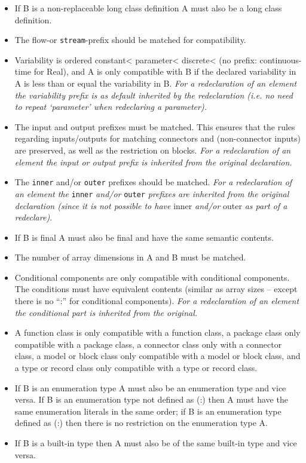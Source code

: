 \begin{itemize}
  \begin{itemize}
  \item
    If B is a non-replaceable long class definition A must also be a
    long class definition.
  \item
    The flow-or \lstinline[basicstyle=\ttfamily]!stream!-prefix should be matched for compatibility.
  \item
    Variability is ordered constant\textless{} parameter\textless{}
    discrete\textless{} (no prefix: continuous-time for Real), and A is
    only compatible with B if the declared variability in A is less than
    or equal the variability in B. \emph{For a redeclaration of an
    element the variability prefix is as default inherited by the
    redeclaration (i.e. no need to repeat `parameter' when redeclaring a
    parameter).}
  \item
    The input and output prefixes must be matched. This ensures that the
    rules regarding inputs/outputs for matching connectors and
    (non-connector inputs) are preserved, as well as the restriction on
    blocks. \emph{For a redeclaration of an element the input or output
    prefix is inherited from the original declaration.}
  \item
    The \lstinline[basicstyle=\ttfamily]!inner! and/or \lstinline[basicstyle=\ttfamily]!outer! prefixes should be matched. \emph{For a
    redeclaration of an element the} \lstinline[basicstyle=\ttfamily]!inner! \emph{and/or} \lstinline[basicstyle=\ttfamily]!outer!
    \emph{prefixes are inherited from the original declaration (since it
    is not possible to have} inner \emph{and/or} outer \emph{as part of
    a redeclare)}.
  \item
    If B is final A must also be final and have the same semantic
    contents.
  \item
    The number of array dimensions in A and B must be matched.
  \item
    Conditional components are only compatible with conditional
    components. The conditions must have equivalent contents (similar as
    array sizes -- except there is no ``:'' for conditional components).
    \emph{For a redeclaration of an element the conditional part is
    inherited from the original.}
  \item
    A function class is only compatible with a function class, a package
    class only compatible with a package class, a connector class only
    with a connector class, a model or block class only compatible with
    a model or block class, and a type or record class only compatible
    with a type or record class.
  \item
    If B is an enumeration type A must also be an enumeration type and
    vice versa. If B is an enumeration type not defined as (:) then A
    must have the same enumeration literals in the same order; if B is
    an enumeration type defined as (:) then there is no restriction on
    the enumeration type A.
  \item
    If B is a built-in type then A must also be of the same built-in
    type and vice versa.
  \end{itemize}
\end{itemize}

